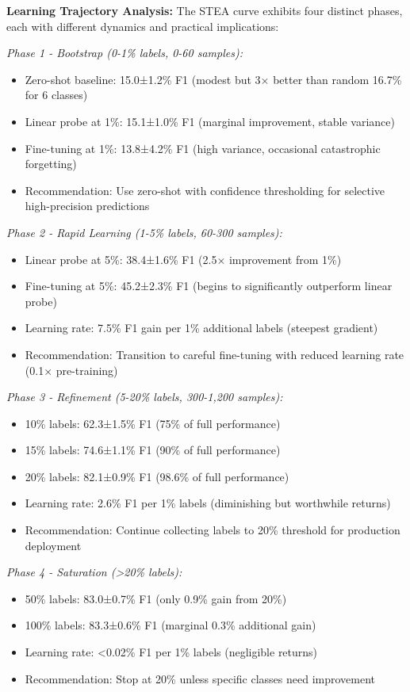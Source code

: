 \documentclass[journal]{IEEEtran}
\begin{document}
\textbf{Learning Trajectory Analysis:}
The STEA curve exhibits four distinct phases, each with different dynamics and practical implications:

\textit{Phase 1 - Bootstrap (0-1\% labels, 0-60 samples):}
\begin{itemize}
\item Zero-shot baseline: 15.0±1.2\% F1 (modest but 3× better than random 16.7\% for 6 classes)
\item Linear probe at 1\%: 15.1±1.0\% F1 (marginal improvement, stable variance)
\item Fine-tuning at 1\%: 13.8±4.2\% F1 (high variance, occasional catastrophic forgetting)
\item Recommendation: Use zero-shot with confidence thresholding for selective high-precision predictions
\end{itemize}

\textit{Phase 2 - Rapid Learning (1-5\% labels, 60-300 samples):}
\begin{itemize}
\item Linear probe at 5\%: 38.4±1.6\% F1 (2.5× improvement from 1\%)
\item Fine-tuning at 5\%: 45.2±2.3\% F1 (begins to significantly outperform linear probe)
\item Learning rate: 7.5\% F1 gain per 1\% additional labels (steepest gradient)
\item Recommendation: Transition to careful fine-tuning with reduced learning rate (0.1× pre-training)
\end{itemize}

\textit{Phase 3 - Refinement (5-20\% labels, 300-1,200 samples):}
\begin{itemize}
\item 10\% labels: 62.3±1.5\% F1 (75\% of full performance)
\item 15\% labels: 74.6±1.1\% F1 (90\% of full performance)
\item 20\% labels: 82.1±0.9\% F1 (98.6\% of full performance)
\item Learning rate: 2.6\% F1 per 1\% labels (diminishing but worthwhile returns)
\item Recommendation: Continue collecting labels to 20\% threshold for production deployment
\end{itemize}

\textit{Phase 4 - Saturation (>20\% labels):}
\begin{itemize}
\item 50\% labels: 83.0±0.7\% F1 (only 0.9\% gain from 20\%)
\item 100\% labels: 83.3±0.6\% F1 (marginal 0.3\% additional gain)
\item Learning rate: <0.02\% F1 per 1\% labels (negligible returns)
\item Recommendation: Stop at 20\% unless specific classes need improvement
\end{itemize}
\end{document}
